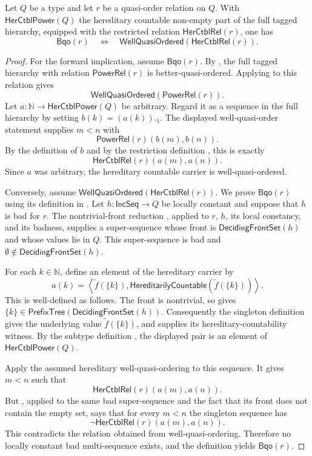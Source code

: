 \begin{theorem}
Let $Q$ be a type and let $r$ be a quasi-order relation on $Q$.  With
$\mathsf{HerCtblPower}(Q)$ the hereditary countable non-empty part of the
full tagged hierarchy, equipped with the restricted relation
$\mathsf{HerCtblRel}(r)$, one has
\[
\mathsf{Bqo}(r)\quad\Longleftrightarrow\quad
\mathsf{WellQuasiOrdered}(\mathsf{HerCtblRel}(r)).
\]
\end{theorem}
\begin{proof}
For the forward implication, assume $\mathsf{Bqo}(r)$.  By
, the full tagged hierarchy with relation
$\mathsf{PowerRel}(r)$ is better-quasi-ordered.  Applying
 to this relation gives
\[
\mathsf{WellQuasiOrdered}(\mathsf{PowerRel}(r)).
\]
Let $a:\mathbb N\to\mathsf{HerCtblPower}(Q)$ be arbitrary.  Regard it as
a sequence in the full hierarchy by setting
$b(k)=(a(k))._1$.  The displayed well-quasi-order statement supplies
$m<n$ with
\[
\mathsf{PowerRel}(r)(b(m),b(n)).
\]
By the definition of $b$ and by the restriction definition
, this is exactly
\[
\mathsf{HerCtblRel}(r)(a(m),a(n)).
\]
Since $a$ was arbitrary, the hereditary countable carrier is
well-quasi-ordered.

Conversely, assume
$\mathsf{WellQuasiOrdered}(\mathsf{HerCtblRel}(r))$.  We prove
$\mathsf{Bqo}(r)$ using its definition in .  Let
$h:\mathsf{IncSeq}\to Q$ be locally constant and suppose that $h$ is
bad for $r$.  The nontrivial-front reduction
, applied to $r$, $h$, its local
constancy, and its badness, supplies a super-sequence
whose front is $\mathsf{DecidingFrontSet}(h)$ and whose values lie in $Q$.
This super-sequence is bad and
$\emptyset\notin\mathsf{DecidingFrontSet}(h)$.

For each $k\in\mathbb N$, define an element of the hereditary carrier by
\[
a(k)=\left\langle
  \widetilde f(\{k\}),
  \mathsf{HereditarilyCountable}(\widetilde f(\{k\}))
\right\rangle.
\]
This is well-defined as follows.  The front is nontrivial, so
 gives
$\{k\}\in\mathsf{PrefixTree}(\mathsf{DecidingFrontSet}(h))$.
Consequently the singleton definition  gives
the underlying value $\widetilde f(\{k\})$, and
 supplies its hereditary-countability witness.
By the subtype definition , the displayed pair is an
element of $\mathsf{HerCtblPower}(Q)$.

Apply the assumed hereditary well-quasi-ordering to this sequence.  It
gives $m<n$ such that
\[
\mathsf{HerCtblRel}(r)(a(m),a(n)).
\]
But , applied to the same bad super-sequence and
the fact that its front does not contain the empty set, says that for
every $m<n$ the singleton sequence has
\[
\neg\mathsf{HerCtblRel}(r)(a(m),a(n)).
\]
This contradicts the relation obtained from well-quasi-ordering.
Therefore no locally constant bad multi-sequence exists, and the
definition  yields $\mathsf{Bqo}(r)$.
\end{proof}
